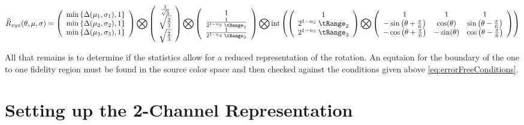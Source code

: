 \begin{equation}
\widehat{R}_{xyz}(\theta,\mu,\sigma) =
\left(
\begin{array}{c}
\min\left\{\Delta(\mu_1,\sigma_1), 1 \right\} \\
\min\left\{\Delta(\mu_2,\sigma_2), 1 \right\}  \\
\min\left\{\Delta(\mu_3,\sigma_3), 1 \right\}  \\
\end{array}
\right)
\bigotimes
\left(
\begin{array}{c}
 \frac{1}{\sqrt{3}} \\
 \sqrt{\frac{2}{3}}  \\
 \sqrt{\frac{2}{3}} \\
\end{array}
\right) \bigotimes
\left(
\begin{array}{c}
 1 \\
 \frac{1}{2^{1-n_2} \; \tRange_2} \\
 \frac{1}{2^{1-n_3} \; \tRange_3} \\
\end{array}
\right) 
\bigotimes
\text{int}\left(
\left(
\begin{array}{c}
 1 \\
 2^{1-n_2} \; \tRange_2\\
 2^{1-n_3} \; \tRange_3 \\
\end{array}
\right) 
\bigotimes
\left(
\begin{array}{ccc}
 1 & 1 & 1 \\
 -\sin \left(\theta +\frac{\pi }{6}\right) &  \cos (\theta ) &  \sin \left(\theta -\frac{\pi }{6}\right) \\
 -\cos \left(\theta +\frac{\pi }{6}\right) & - \sin (\theta ) & \cos \left(\theta -\frac{\pi }{6}\right) \\
\end{array}
\right)
\right)
\end{equation}

All that remains is to determine if the statistics allow for a reduced representation of the rotation. An equtaion for the boundary of the one to one fidelity region must be found in the source color space and then checked against the conditions given above \ref{eq:errorFreeConditions}. 

\section{Setting up the 2-Channel Representation}\label{sec:SettingUp2-ChannelRepresentation}

